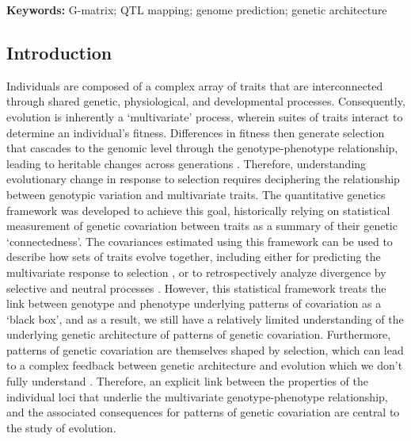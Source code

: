 \par
\vspace{1em}
\noindent\textbf{Keywords:} G-matrix; QTL mapping; genome prediction; genetic architecture
\newpage

\begin{refsection}

\section{Introduction}

Individuals are composed of a complex array of traits that are interconnected
through shared genetic, physiological, and developmental processes.
Consequently, evolution is inherently a `multivariate' process, wherein suites
of traits interact to determine an individual's fitness. Differences in
fitness then generate selection that cascades to the genomic level through the
genotype-phenotype relationship, leading to heritable changes across
generations \parencite{Lande1983-ez,Klingenberg2008-ll,Melo2016-yw}.
Therefore, understanding evolutionary change in response to selection requires
deciphering the relationship between genotypic variation and multivariate
traits. The quantitative genetics framework was developed to achieve this
goal, historically relying on statistical measurement of genetic covariation
between traits as a summary of their genetic `connectedness'. The covariances
estimated using this framework can be used to describe how sets of traits
evolve together, including either for predicting the multivariate response to
selection \parencite{Lande1979-by}, or to retrospectively analyze divergence
by selective and neutral processes \parencite{Felsenstein1988-ql}. However,
this statistical framework treats the link between genotype and phenotype
underlying patterns of covariation as a `black box', and as a result, we still
have a relatively limited understanding of the underlying genetic architecture
of patterns of genetic covariation. Furthermore, patterns of genetic
covariation are themselves shaped by selection, which can lead to a complex
feedback between genetic architecture and evolution which we don't fully
understand \parencite{Turelli1994-pg,Jones2004-be,Jones2014-wj}. Therefore, an
explicit link between the properties of the individual loci that underlie the
multivariate genotype-phenotype relationship, and the associated consequences
for patterns of genetic covariation are central to the study of evolution.


\end{refsection}
